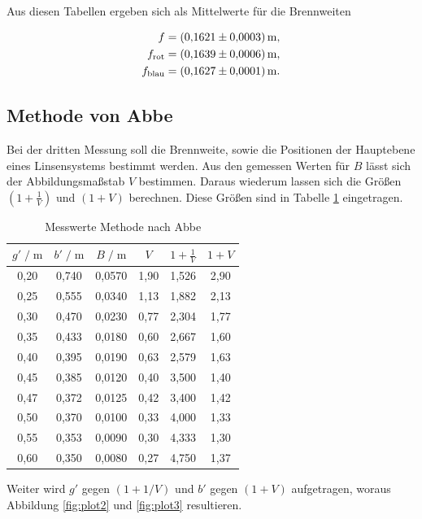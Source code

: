 Aus diesen Tabellen ergeben sich als Mittelwerte für die Brennweiten

\begin{align*}
f &= \SI{0.1621+-0.0003}{\meter},\\
f_\text{rot} &= \SI{0.1639+-0.0006}{\meter},\\
f_\text{blau} & = \SI{0.1627+-0.0001}{\meter}.
\end{align*}

\subsection{Methode von Abbe}
Bei der dritten Messung soll die Brennweite, sowie die Positionen der Hauptebene eines Linsensystems 
bestimmt werden. Aus den gemessen Werten für $B$ lässt sich der Abbildungsmaßstab $V$ bestimmen. Daraus 
wiederum lassen sich die Größen $(1+\frac{1}{V})$ und $(1+V)$ berechnen. Diese Größen sind 
in Tabelle \ref{tab:mess5} eingetragen.

\begin{table}
    \centering
    \caption{Messwerte Methode nach Abbe}
    \label{tab:mess5}
    \begin{tabular}{c c c c c c}
    \toprule
    $ g' \;/\; \si{\meter} $ & $b' \;/\; \si{\meter}$ &
    $ B \;/\; \si{\meter} $ & $V$ & $1+\frac{1}{V}$ & $1+V$\\
    \midrule 
        0,20 & 0,740 & 0,0570 & 1,90 & 1,526 & 2,90\\
        0,25 & 0,555 & 0,0340 & 1,13 & 1,882 & 2,13\\
        0,30 & 0,470 & 0,0230 & 0,77 & 2,304 & 1,77\\
        0,35 & 0,433 & 0,0180 & 0,60 & 2,667 & 1,60\\
        0,40 & 0,395 & 0,0190 & 0,63 & 2,579 & 1,63\\
        0,45 & 0,385 & 0,0120 & 0,40 & 3,500 & 1,40\\
        0,47 & 0,372 & 0,0125 & 0,42 & 3,400 & 1,42\\
        0,50 & 0,370 & 0,0100 & 0,33 & 4,000 & 1,33\\
        0,55 & 0,353 & 0,0090 & 0,30 & 4,333 & 1,30\\
        0,60 & 0,350 & 0,0080 & 0,27 & 4,750 & 1,37\\          
    \bottomrule
    \end{tabular}
    \end{table}

Weiter wird $g'$ gegen $(1+1/V)$ und $b'$ gegen $(1+V)$ aufgetragen, woraus Abbildung \ref{fig:plot2}
und \ref{fig:plot3} resultieren.  


